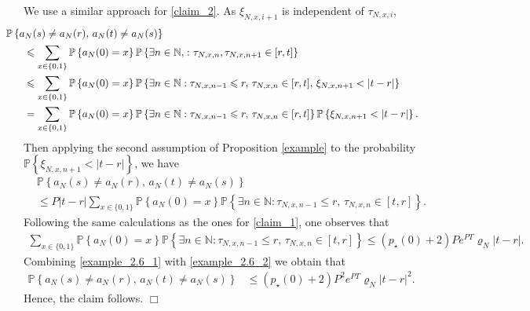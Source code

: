 \documentclass[11pt,reqno]{amsart}
\numberwithin{equation}{section}
\newcommand{\abs}[1]{\left\lvert #1 \right\rvert}
\newcommand{\pk}[1]{\mathbb{P} \left\{ #1 \right \} }
\newcommand{\N}{\mathbb{N}}
\newcommand{\neprop}[1]{{Proposition \ref{#1}}}
\newcommand{\QED}{\hfill $\Box$}
\begin{document}
{We use a similar approach for \eqref{claim_2}. As $\xi_{N,x,i+1}$ is independent of $\tau_{N,x,i}$,
\begin{align*}
    &\hspace{-6mm}\pk{a_N(s)\not= a_N(r),\, a_N(t)\not= a_N(s)} \\&\leqslant \sum_{{x\in\{0,1\}}}\pk{a_N(0)=x}\pk{\exists n\in\N,\colon \tau_{N,x,n},\tau_{N,x,n+1}\in{[r,t]}}\\
    &\leqslant \sum_{{x\in\{0,1\}}}\pk{a_N(0)=x}\pk{\exists n\in\N:\tau_{N,x,n-1}\leqslant r,\,\tau_{N,x,n}\in [r,t],\, \xi_{N,x,n+1}<\abs{t-r}}\\
    &= \sum_{{x\in\{0,1\}}}\pk{a_N(0)=x}\pk{\exists n\in\N:\tau_{N,x,n-1}\leqslant r,\,\tau_{N,x,n}\in[r,t]}\pk{\xi_{N,x,n+1}<\abs{t-r}}.
\end{align*}
    Then applying the second assumption of \neprop{example} to the probability $\pk{\xi_{N,x,n+1}<\abs{t-r}}$, we have
\begin{align}
    &\pk{a_N(s)\not= a_N(r),\, a_N(t)\not= a_N(s)}\nonumber\\ 
    &\leqslant P\abs{t-r}\sum_{{x\in\{0,1\}}}\pk{a_N(0)=x}\pk{\exists n\in\N\colon\tau_{N,x,n-1}\leqslant r,\,\tau_{N,x,n}\in[t,r]}.\label{example_2.6_1}
\end{align}
Following the same calculations as the ones for \eqref{claim_1}, one observes that
\begin{align}
    \sum_{{x\in\{0,1\}}}\pk{a_N(0)=x}\pk{\exists n\in\N\colon\tau_{N,x,n-1}\leqslant r,\,\tau_{N,x,n}\in[t,r]}\leqslant (p_{\star}(0)+2)Pe^{PT}\varrho_N\abs{t-r}.\label{example_2.6_2}  
\end{align}
Combining \eqref{example_2.6_1} with \eqref{example_2.6_2} we obtain that
\begin{align*}
     \pk{a_N(s)\not= a_N(r),\, a_N(t)\not= a_N(s)}&\leqslant (p_{\star}(0)+2)P^2e^{PT}\varrho_N\abs{t-r}^2.
\end{align*}
}
Hence, the claim follows.
\QED

\medskip
\end{document}
